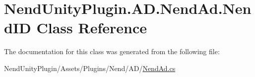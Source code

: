 \hypertarget{class_nend_unity_plugin_1_1_a_d_1_1_nend_ad_1_1_nend_i_d}{}\section{Nend\+Unity\+Plugin.\+A\+D.\+Nend\+Ad.\+Nend\+I\+D Class Reference}
\label{class_nend_unity_plugin_1_1_a_d_1_1_nend_ad_1_1_nend_i_d}


The documentation for this class was generated from the following file\+:\begin{DoxyCompactItemize}
\item 
Nend\+Unity\+Plugin/\+Assets/\+Plugins/\+Nend/\+A\+D/\hyperlink{_nend_ad_8cs}{Nend\+Ad.\+cs}\end{DoxyCompactItemize}
